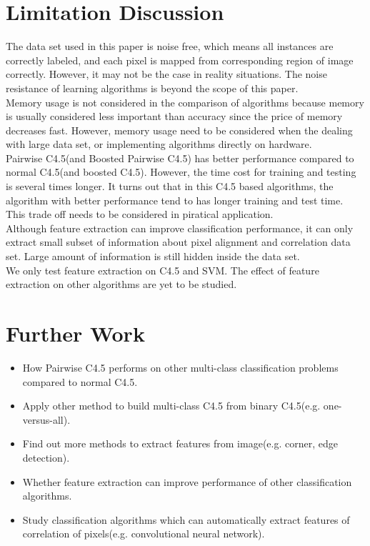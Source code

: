 \documentclass[a4paper,11pt]{article}
\begin{document}
\section{Limitation Discussion}
The data set used in this paper is noise free, which means all instances are correctly labeled, and each pixel is mapped from corresponding region of image correctly. However, it may not be the case in reality situations. The noise resistance of learning algorithms is beyond the scope of this paper.\\
Memory usage is not considered in the comparison of algorithms because memory is usually considered less important than accuracy since the price of memory decreases fast. However, memory usage need to be considered when the dealing with large data set, or implementing algorithms directly on hardware.\\
Pairwise C4.5(and Boosted Pairwise C4.5) has better performance compared to normal C4.5(and boosted C4.5). However, the time cost for training and testing is several times longer. It turns out that in this C4.5 based algorithms, the algorithm with better performance tend to has longer training and test time. This trade off needs to be considered in piratical application.\\
Although feature extraction can improve classification performance, it can only extract small subset of information about pixel alignment and correlation data set. Large amount of information is still hidden inside the data set.\\
We only test feature extraction on C4.5 and SVM. The effect of feature extraction on other algorithms are yet to be studied.\\

\section{Further Work}
\begin{itemize}
 \item How Pairwise C4.5 performs on other multi-class classification problems compared to normal C4.5.
 \item Apply other method to build multi-class C4.5 from binary C4.5(e.g. one-versus-all).
 \item Find out more methods to extract features from image(e.g. corner, edge detection).
 \item Whether feature extraction can improve performance of other classification algorithms.
 \item Study classification algorithms which can automatically extract features of correlation of pixels(e.g. convolutional neural network\cite{lecun98}).
\end{itemize}
\end{document}
